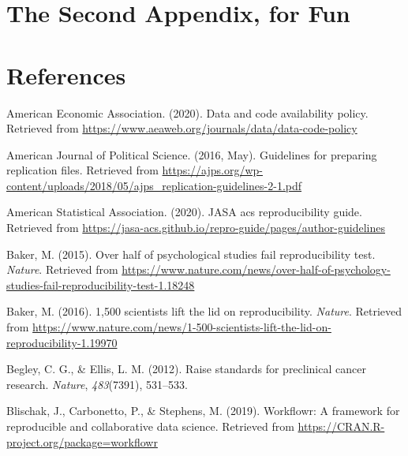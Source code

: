 \documentclass[12pt,twoside]{reedthesis}
\begin{document}
\chapter{The Second Appendix, for
Fun}\label{the-second-appendix-for-fun}

\backmatter

\chapter*{References}\label{references}


\noindent

\setlength{\parindent}{-0.20in} \setlength{\leftskip}{0.20in}
\setlength{\parskip}{8pt}

\hypertarget{refs}{}
\hypertarget{ref-aee-policy}{}
American Economic Association. (2020). Data and code availability
policy. Retrieved from
\url{https://www.aeaweb.org/journals/data/data-code-policy}

\hypertarget{ref-ajps-guidelines}{}
American Journal of Political Science. (2016, May). Guidelines for
preparing replication files. Retrieved from
\url{https://ajps.org/wp-content/uploads/2018/05/ajps_replication-guidelines-2-1.pdf}

\hypertarget{ref-asa-guide}{}
American Statistical Association. (2020). JASA acs reproducibility
guide. Retrieved from
\url{https://jasa-acs.github.io/repro-guide/pages/author-guidelines}

\hypertarget{ref-nature-psych}{}
Baker, M. (2015). Over half of psychological studies fail
reproducibility test. \emph{Nature}. Retrieved from
\url{https://www.nature.com/news/over-half-of-psychology-studies-fail-reproducibility-test-1.18248}

\hypertarget{ref-nature-crisis}{}
Baker, M. (2016). 1,500 scientists lift the lid on reproducibility.
\emph{Nature}. Retrieved from
\url{https://www.nature.com/news/1-500-scientists-lift-the-lid-on-reproducibility-1.19970}

\hypertarget{ref-begley2012raise}{}
Begley, C. G., \& Ellis, L. M. (2012). Raise standards for preclinical
cancer research. \emph{Nature}, \emph{483}(7391), 531--533.

\hypertarget{ref-R-workflowr}{}
Blischak, J., Carbonetto, P., \& Stephens, M. (2019). Workflowr: A
framework for reproducible and collaborative data science. Retrieved
from \url{https://CRAN.R-project.org/package=workflowr}
\end{document}
